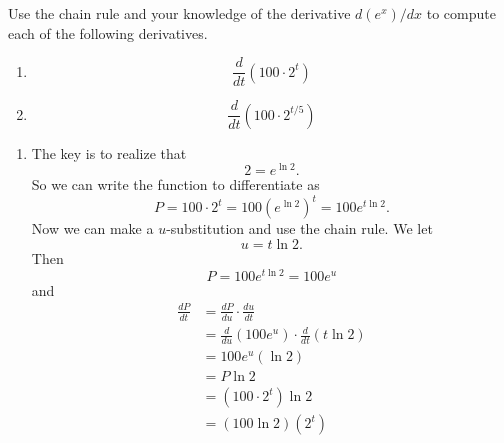 \documentclass{ximera}
\begin{document}
\begin{question}  \label{Qdghnntnmnmnmn}
Use the chain rule and your knowledge of the derivative $d(e^x)/dx$ to compute each of the following derivatives.

\begin{enumerate}
\item 
\[
   \frac{d}{dt}\left( 100 \cdot 2^t \right)
\]

\item 
\[
   \frac{d}{dt}\left( 100 \cdot 2^{t/5} \right)
\]
\end{enumerate}
\begin{explanation}

\begin{enumerate}
\item The key is to realize that 
\[
    2 = e^{\ln 2} .
\]
So we can write the function to differentiate as
\[
    P = 100 \cdot 2^t = 100 \left( e^{\ln 2} \right)^t = 100e^{t\ln 2} .
\]
Now we can make a $u$-substitution and use the chain rule. We let
\[
       u =t \ln 2 .
\]
Then
\[
      P = 100e^{t\ln 2} = 100e^u
\]
and
\begin{align*}
   \frac{dP}{dt} &= \frac{dP}{du} \cdot \frac{du}{dt} \\
                       &= \frac{d}{du} \left(100e^u\right) \cdot  \frac{d}{dt} \left(  t\ln 2 \right) \\
                        &= 100e^u (\ln 2) \\
                        &= P \ln 2 \\
                     &= (100 \cdot 2^t) \ln 2\\
                        &= (100 \ln 2)(2^t)
\end{align*}

\end{enumerate}
\end{explanation}

\end{question}
\end{document}
